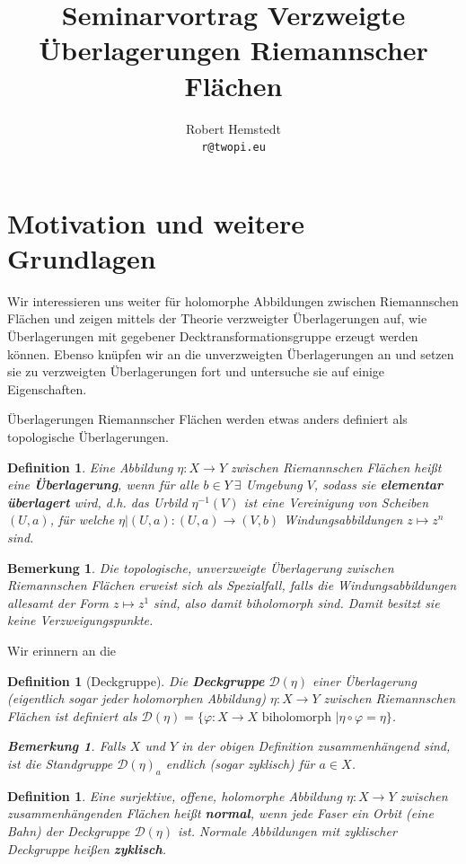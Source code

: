 \documentclass[12pt,a4paper]{article}
\author{Robert Hemstedt \\ \texttt{r@twopi.eu}}
\title{Seminarvortrag Verzweigte Überlagerungen Riemannscher Flächen}
\theoremstyle{plain}
\newtheorem{Definition}[Theorem]{Definition}
\newtheorem{Bemerkung}[Theorem]{Bemerkung}
\newcommand{\herv}[1]{{\emph{\textbf{#1}}}}
\numberwithin{equation}{section}
\begin{document}
\maketitle
\section{Motivation und weitere Grundlagen}
Wir interessieren uns weiter für holomorphe Abbildungen zwischen Riemannschen Flächen und zeigen mittels der Theorie verzweigter Überlagerungen auf, wie Überlagerungen mit gegebener Decktransformationsgruppe erzeugt werden können. Ebenso knüpfen wir an die unverzweigten Überlagerungen an und setzen sie zu verzweigten Überlagerungen fort und untersuche sie auf einige Eigenschaften.

Überlagerungen Riemannscher Flächen werden etwas anders definiert als topologische Über\-la\-ge\-run\-gen.
\begin{Definition} Eine Abbildung $\eta: X \rightarrow Y$ zwischen Riemannschen Flächen heißt eine \herv{Überlagerung}, wenn für alle $b\in Y\ \exists$ Umgebung $V$, sodass sie \herv{elementar überlagert} wird, d.h. das Urbild $\eta^{-1}(V)$ ist eine Vereinigung von Scheiben $(U,a)$, für welche $\eta|(U,a): (U,a) \rightarrow (V,b)$ Windungsabbildungen  $z\mapsto z^n$ sind.
\end{Definition}
\begin{Bemerkung} Die topologische, \emph{unverzweigte} Überlagerung zwischen Riemannschen Flä\-chen erweist sich als Spezialfall, falls die Windungsabbildungen allesamt der Form $z \mapsto z^1$ sind, also damit biholomorph sind. Damit besitzt sie keine Verzweigungspunkte.
\end{Bemerkung}
Wir erinnern an die 
\begin{Definition}[Deckgruppe] Die \herv{Deckgruppe} $\mathcal{D}(\eta)$ einer Überlagerung (eigentlich sogar jeder holomorphen Abbildung) $\eta: X \rightarrow Y$ zwischen Riemannschen Flächen ist definiert als $\mathcal{D}(\eta) = \{ \varphi: X\rightarrow X \text{ biholomorph }|\eta\circ\varphi = \eta \}$.
\begin{Bemerkung} Falls $X$ und $Y$ in der obigen Definition zusammenhängend sind, ist die Standgruppe $\mathcal{D}(\eta)_a$ endlich (sogar zyklisch) für $a\in X$.
\end{Bemerkung}
\end{Definition}
\begin{Definition}Eine surjektive, offene, holomorphe Abbildung $\eta : X \rightarrow Y$ zwischen zusammenhängenden Flächen heißt \herv{normal}, wenn jede Faser ein Orbit (eine Bahn) der Deckgruppe $\mathcal{D(\eta)}$ ist. Normale Abbildungen mit zyklischer Deckgruppe heißen \herv{zyklisch}.
\end{Definition}
\end{document}
